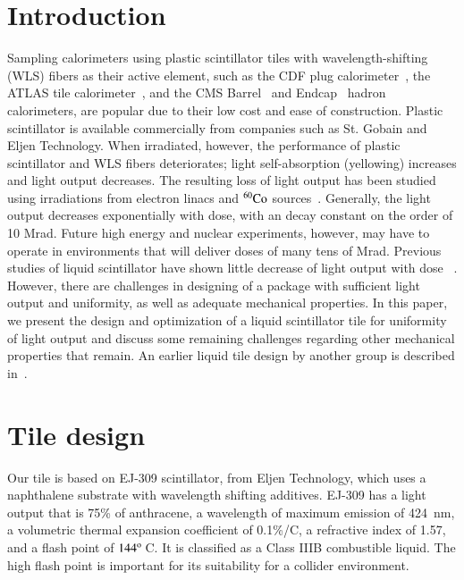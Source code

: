\documentclass[review]{elsarticle}
\begin{document}
\linenumbers

\section{Introduction}
Sampling calorimeters using plastic scintillator tiles with
wavelength-shifting (WLS) fibers as their active element, such as the CDF plug
calorimeter~\cite{Aota1995557}, the ATLAS tile calorimeter~\cite{atlastile}, 
and the CMS Barrel~\cite{CMSHB} and
Endcap~\cite{HCALTDR1997} hadron calorimeters, are popular due to their
low cost and ease of construction. Plastic scintillator is available
commercially from companies such as St. Gobain and Eljen Technology. When
irradiated, however, the performance of plastic scintillator and WLS
fibers deteriorates; light self-absorption (yellowing) increases and
light output decreases. The resulting loss of light output 
has been studied using irradiations
from electron linacs and ${\rm ^{60}Co}$ sources~\cite{vasken,ByonWagner1993263}.
Generally, the light output decreases exponentially with dose, with an
decay constant on the order of 10 Mrad. Future high energy and nuclear
experiments, however, may have to operate in environments that will
deliver doses of many tens of Mrad.
Previous studies of liquid scintillator have shown little decrease
of light output with dose ~\cite{zornliquid,Klein1967399,berlman}.
However, there are challenges in designing of a package
with sufficient light output and uniformity, as well as 
adequate mechanical properties.
In this paper, we present the design
and optimization of a liquid scintillator tile for uniformity
of light output and discuss some remaining challenges regarding
other mechanical properties that remain.
An earlier liquid tile design by another group is described in~\cite{liquidrandy}.

\section{Tile design}
\label{sec:design}
Our tile is based on EJ-309 scintillator, from Eljen Technology, which
uses a naphthalene substrate with wavelength shifting additives.
EJ-309 has a light output that is 75\% of anthracene, a wavelength of
maximum emission of 424~nm, a volumetric thermal expansion coefficient
of 0.1\%/C,
a refractive index of 1.57, and a flash
point of $\rm{144^o}$\,C. It is classified as a Class IIIB combustible liquid.
The high flash point is important for its
suitability for a collider environment.
\end{document}
